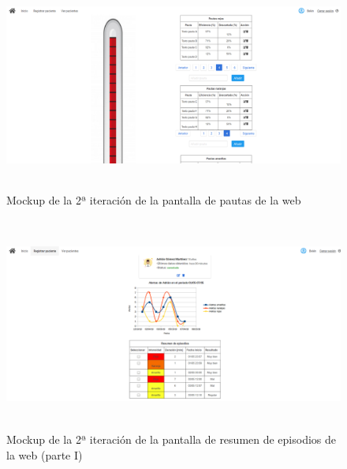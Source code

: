 \begin{figure}[H]
    \centering
    \includegraphics[width=0.8\linewidth, height=7cm]{Imagenes/04DescProblema/mockups/v2/web/02-pautas.png}
    \caption[Mockup de la 2ª iteración de la pantalla de pautas de la web]{Mockup de la 2ª iteración de la pantalla de pautas de la web}
    \label{c4:fig:v2:web:pautas}
\end{figure}

\begin{figure}[H]
    \centering
    \begin{minipage}{.45\textwidth}
        \centering
        \includegraphics[width=0.8\linewidth, height=7cm]{Imagenes/04DescProblema/mockups/v2/web/03-resumenEpisodios.png}
        \caption[Mockup de la 2ª iteración de la pantalla de resumen de episodios de la web (parte I)]{Mockup de la 2ª iteración de la pantalla de resumen de episodios de la web (parte I)}
        \label{c4:fig:v2:web:episodios1}
    \end{minipage}
\end{figure}

